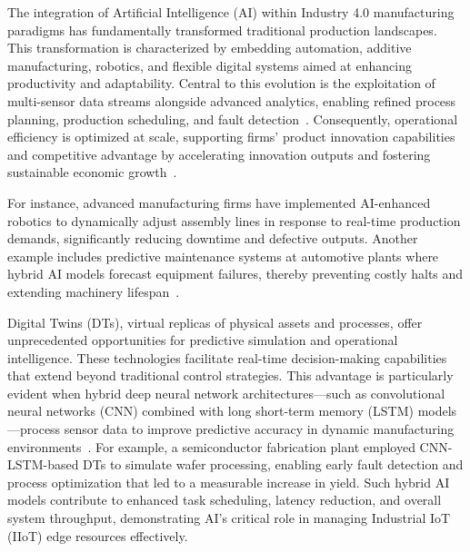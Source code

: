 \documentclass[sigconf]{acmart}
\begin{document}
The integration of Artificial Intelligence (AI) within Industry 4.0 manufacturing paradigms has fundamentally transformed traditional production landscapes. This transformation is characterized by embedding automation, additive manufacturing, robotics, and flexible digital systems aimed at enhancing productivity and adaptability. Central to this evolution is the exploitation of multi-sensor data streams alongside advanced analytics, enabling refined process planning, production scheduling, and fault detection~\cite{ref6,ref7,ref33,ref35}. Consequently, operational efficiency is optimized at scale, supporting firms’ product innovation capabilities and competitive advantage by accelerating innovation outputs and fostering sustainable economic growth~\cite{ref20}. 

For instance, advanced manufacturing firms have implemented AI-enhanced robotics to dynamically adjust assembly lines in response to real-time production demands, significantly reducing downtime and defective outputs. Another example includes predictive maintenance systems at automotive plants where hybrid AI models forecast equipment failures, thereby preventing costly halts and extending machinery lifespan~\cite{ref33,ref31}.

Digital Twins (DTs), virtual replicas of physical assets and processes, offer unprecedented opportunities for predictive simulation and operational intelligence. These technologies facilitate real-time decision-making capabilities that extend beyond traditional control strategies. This advantage is particularly evident when hybrid deep neural network architectures—such as convolutional neural networks (CNN) combined with long short-term memory (LSTM) models—process sensor data to improve predictive accuracy in dynamic manufacturing environments~\cite{ref31,ref33,ref35}. For example, a semiconductor fabrication plant employed CNN-LSTM-based DTs to simulate wafer processing, enabling early fault detection and process optimization that led to a measurable increase in yield. Such hybrid AI models contribute to enhanced task scheduling, latency reduction, and overall system throughput, demonstrating AI’s critical role in managing Industrial IoT (IIoT) edge resources effectively.
\end{document}

